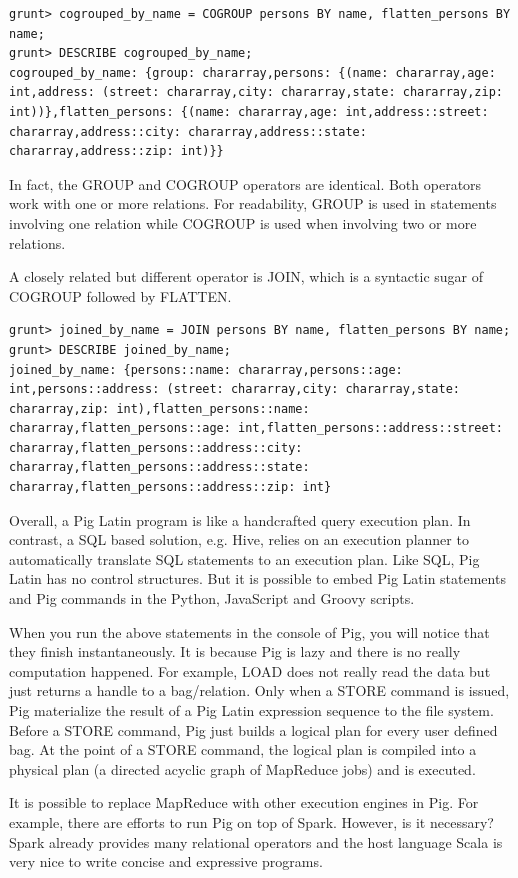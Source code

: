 \documentclass[12pt]{book}
\begin{document}
\begin{lstlisting}
grunt> cogrouped_by_name = COGROUP persons BY name, flatten_persons BY name;
grunt> DESCRIBE cogrouped_by_name;
cogrouped_by_name: {group: chararray,persons: {(name: chararray,age: int,address: (street: chararray,city: chararray,state: chararray,zip: int))},flatten_persons: {(name: chararray,age: int,address::street: chararray,address::city: chararray,address::state: chararray,address::zip: int)}}
\end{lstlisting}
In fact, the GROUP and COGROUP operators are identical. Both operators work with one or more relations. For readability, GROUP is used in statements involving one relation while COGROUP is used when involving two or more relations.

A closely related but different operator is JOIN, which is a syntactic sugar of COGROUP followed by FLATTEN.

\begin{lstlisting}
grunt> joined_by_name = JOIN persons BY name, flatten_persons BY name;
grunt> DESCRIBE joined_by_name;
joined_by_name: {persons::name: chararray,persons::age: int,persons::address: (street: chararray,city: chararray,state: chararray,zip: int),flatten_persons::name: chararray,flatten_persons::age: int,flatten_persons::address::street: chararray,flatten_persons::address::city: chararray,flatten_persons::address::state: chararray,flatten_persons::address::zip: int}
\end{lstlisting}
Overall, a Pig Latin program is like a handcrafted query execution plan. In contrast, a SQL based solution, e.g. Hive, relies on an execution planner to automatically translate SQL statements to an execution plan. Like SQL, Pig Latin has no control structures. But it is possible to embed Pig Latin statements and Pig commands in the Python, JavaScript and Groovy scripts.

When you run the above statements in the console of Pig, you will notice that they finish instantaneously. It is because Pig is lazy and there is no really computation happened. For example, LOAD does not really read the data but just returns a handle to a bag/relation. Only when a STORE command is issued, Pig materialize the result of a Pig Latin expression sequence to the file system. Before a STORE command, Pig just builds a logical plan for every user defined bag. At the point of a STORE command, the logical plan is compiled into a physical plan (a directed acyclic graph of MapReduce jobs) and is executed.

It is possible to replace MapReduce with other execution engines in Pig. For example, there are efforts to run Pig on top of Spark. However, is it necessary? Spark already provides many relational operators and the host language Scala is very nice to write concise and expressive programs.
\end{document}
